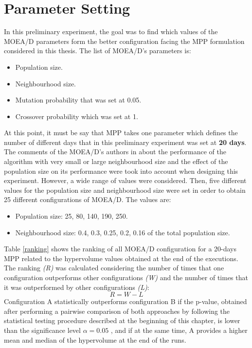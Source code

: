 \section{Parameter Setting}
In this preliminary experiment, the goal was to find which values of the MOEA/D\cite{Zhang2007} parameters form the better configuration facing the MPP formulation considered in this thesis. The list of MOEA/D's parameters is:
\begin{itemize}
    \item Population size.
    \item Neighbourhood size.
    \item Mutation probability that was set at 0.05.
    \item Crossover probability which was set at 1.
\end{itemize}
At this point, it must be say that MPP takes one parameter which defines the number of different days that in this preliminary experiment was set at \textbf{20 days}. 
The comments of the MOEA/D's authors in \cite{Zhang2007} about the performance of the algorithm with very small or large neighbourhood size and the effect of the population size on its performance were took into account when designing this experiment. However, a wide range of values were considered. Then, five different values for the population size and neighbourhood size were set in order to obtain 25 different configurations of MOEA/D. The values are:
\begin{itemize}
    \item Population size: 25, 80, 140, 190, 250.
    \item Neighbourhood size: 0.4, 0.3, 0.25, 0.2, 0.16 of the total population size.
\end{itemize}
Table \ref{ranking} shows the ranking of all MOEA/D configuration for a 20-days MPP related to the hypervolume values obtained at the end of the executions. The ranking \textit{(R)} was calculated considering the number of times that one configuration outperforms other configurations \textit{(W)} and the number of times that it was outperformed by other configurations \textit{(L)}: 
\[ 
R = W - L
\]
Configuration A statistically outperforms configuration B if the p-value, obtained after performing a pairwise comparison of both approaches by following the statistical testing procedure described at the beginning of this chapter, is lower than the significance level $\alpha = 0.05$ , and if at the same time, A provides a higher mean and median of the hypervolume at the end of the runs\cite{Miranda2018}.

